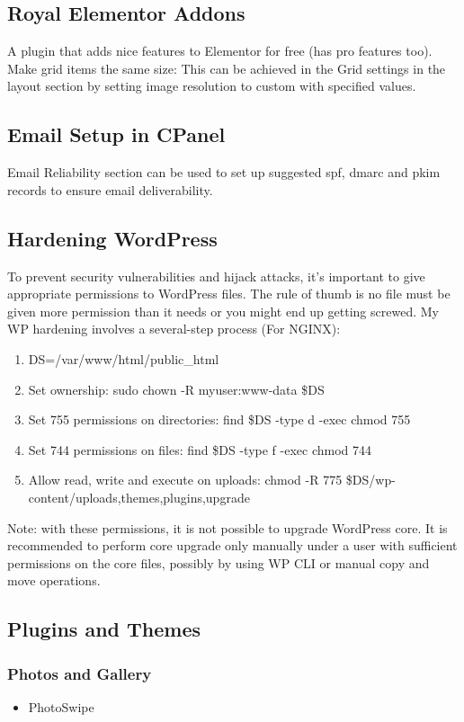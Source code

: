\documentclass{article}
\begin{document}
\subsection{Royal Elementor Addons}
A plugin that adds nice features to Elementor for free (has pro features too). 
Make grid items the same size: This can be achieved in the Grid settings in the layout section by setting image resolution to custom with specified values.
\subsection{Email Setup in CPanel}
Email Reliability section can be used to set up suggested spf, dmarc and pkim records to ensure email deliverability.

\subsection{Hardening WordPress}
To prevent security vulnerabilities and hijack attacks, it's important to give appropriate permissions to WordPress files. 
The rule of thumb is no file must be given more permission than it needs or you might end up getting screwed. 
My WP hardening involves a several-step process (For NGINX):
\begin{enumerate}
  \item DS=/var/www/html/public_html
  \item Set ownership: sudo chown -R myuser:www-data \$DS
  \item Set 755 permissions on directories: find \$DS -type d -exec chmod 755 {} \; 
  \item Set 744 permissions on files:  find \$DS -type f -exec chmod 744 {} \;
  \item Allow read, write and execute on uploads: chmod -R 775 \$DS/wp-content/{uploads,themes,plugins,upgrade}
\end{enumerate}
Note: with these permissions, it is not possible to upgrade WordPress core. It is recommended to perform core upgrade only manually 
under a user with sufficient permissions on the core files, possibly by using WP CLI or manual copy and move operations.


\subsection{Plugins and Themes}
\subsubsection{Photos and Gallery}
\begin{itemize}
	\item PhotoSwipe
	
\end{itemize}
\end{document}
